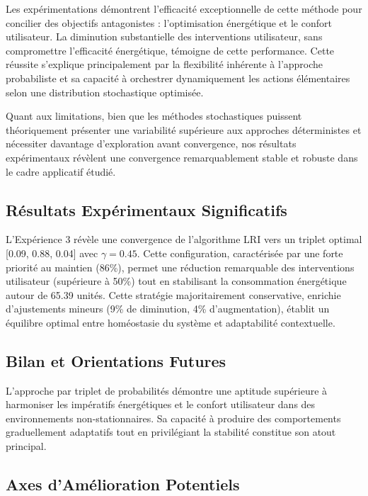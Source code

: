 \documentclass[a4paper,11pt]{article}
\begin{document}
Les expérimentations démontrent l'efficacité exceptionnelle de cette méthode pour concilier des objectifs antagonistes : l'optimisation énergétique et le confort utilisateur. La diminution substantielle des interventions utilisateur, sans compromettre l'efficacité énergétique, témoigne de cette performance. Cette réussite s'explique principalement par la flexibilité inhérente à l'approche probabiliste et sa capacité à orchestrer dynamiquement les actions élémentaires selon une distribution stochastique optimisée.

Quant aux limitations, bien que les méthodes stochastiques puissent théoriquement présenter une variabilité supérieure aux approches déterministes et nécessiter davantage d'exploration avant convergence, nos résultats expérimentaux révèlent une convergence remarquablement stable et robuste dans le cadre applicatif étudié.

\subsection{Résultats Expérimentaux Significatifs}

L'Expérience 3 révèle une convergence de l'algorithme LRI vers un triplet optimal [0.09, 0.88, 0.04] avec $\gamma=0.45$. Cette configuration, caractérisée par une forte priorité au maintien (86\%), permet une réduction remarquable des interventions utilisateur (supérieure à 50\%) tout en stabilisant la consommation énergétique autour de 65.39 unités. Cette stratégie majoritairement conservative, enrichie d'ajustements mineurs (9\% de diminution, 4\% d'augmentation), établit un équilibre optimal entre homéostasie du système et adaptabilité contextuelle.

\subsection{Bilan et Orientations Futures}

L'approche par triplet de probabilités démontre une aptitude supérieure à harmoniser les impératifs énergétiques et le confort utilisateur dans des environnements non-stationnaires. Sa capacité à produire des comportements graduellement adaptatifs tout en privilégiant la stabilité constitue son atout principal.

\subsection{Axes d'Amélioration Potentiels}
\end{document}
